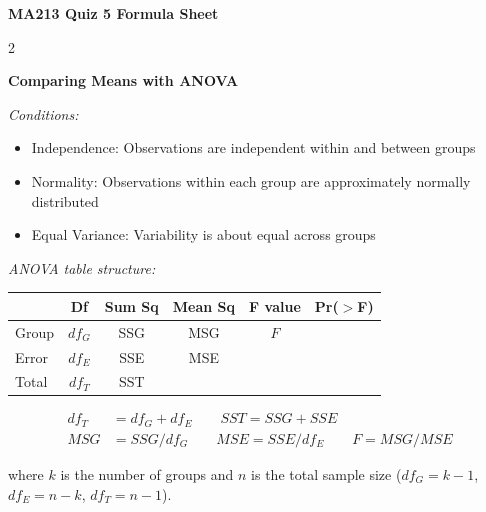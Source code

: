 \documentclass[8pt]{article}
\begin{document}
\begin{center}
    {\LARGE \textbf{MA213 Quiz 5 Formula Sheet}}
\end{center}

\vspace{1em}





\clearpage

\begin{multicols}{2} %







\clearpage

\textbf{Comparing Means with ANOVA}

\textit{Conditions:}
\begin{itemize}
    \item Independence: Observations are independent within and between groups
    \item Normality: Observations within each group are approximately normally distributed
    \item Equal Variance: Variability is about equal across groups
\end{itemize}

\textit{ANOVA table structure:}

{\footnotesize
\begin{center}
\begin{tabular}{l c c c c c}
\hline
 & Df & Sum Sq & Mean Sq & F value & Pr($>$F) \\
\hline
Group & $df_G$ & SSG & MSG & $F$ & \\
Error & $df_E$ & SSE & MSE & & \\
\hline
Total & $df_T$ & SST & & & \\
\hline
\end{tabular}
\end{center}
}

{\small
\begin{align*}
    df_T &= df_G + df_E \qquad SST = SSG + SSE \\
    MSG &= SSG / df_G \qquad MSE = SSE / df_E \qquad F = MSG / MSE
\end{align*}
}

where $k$ is the number of groups and $n$ is the total sample size ($df_G = k-1$, $df_E = n-k$, $df_T = n-1$).


\end{multicols}
\end{document}
